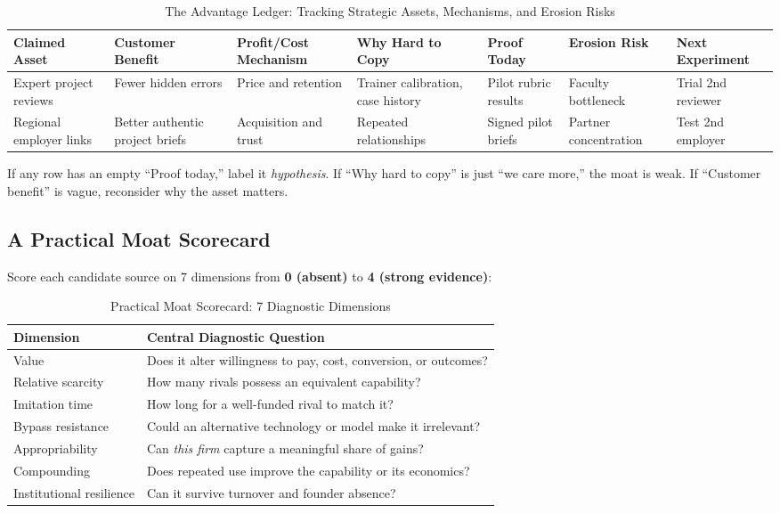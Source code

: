 \begin{table}[t]
\centering
\small
\caption{The Advantage Ledger: Tracking Strategic Assets, Mechanisms, and Erosion Risks}
\label{tab:advantage_ledger}
\begin{tabularx}{\textwidth}{p{2.2cm} p{2cm} p{2cm} p{2.6cm} p{1.8cm} p{2.4cm} X}
\toprule
\textbf{Claimed Asset} & \textbf{Customer Benefit} & \textbf{Profit/Cost Mechanism} & \textbf{Why Hard to Copy} & \textbf{Proof Today} & \textbf{Erosion Risk} & \textbf{Next Experiment} \\
\midrule
Expert project reviews & Fewer hidden errors & Price and retention & Trainer calibration, case history & Pilot rubric results & Faculty bottleneck & Trial 2nd reviewer \\
Regional employer links & Better authentic project briefs & Acquisition and trust & Repeated relationships & Signed pilot briefs & Partner concentration & Test 2nd employer \\
\bottomrule
\end{tabularx}
\end{table}

If any row has an empty ``Proof today,'' label it \textit{hypothesis}. If ``Why hard to copy'' is just ``we care more,'' the moat is weak. If ``Customer benefit'' is vague, reconsider why the asset matters.

\subsection{A Practical Moat Scorecard}
\label{sec:practical_moat_scorecard}

Score each candidate source on 7 dimensions from \textbf{0 (absent)} to \textbf{4 (strong evidence)}:

\begin{table}[h]
\centering
\small
\caption{Practical Moat Scorecard: 7 Diagnostic Dimensions}
\label{tab:moat_scorecard}
\begin{tabularx}{\columnwidth}{l X}
\toprule
\textbf{Dimension} & \textbf{Central Diagnostic Question} \\
\midrule
Value & Does it alter willingness to pay, cost, conversion, or outcomes? \\
Relative scarcity & How many rivals possess an equivalent capability? \\
Imitation time & How long for a well-funded rival to match it? \\
Bypass resistance & Could an alternative technology or model make it irrelevant? \\
Appropriability & Can \textit{this firm} capture a meaningful share of gains? \\
Compounding & Does repeated use improve the capability or its economics? \\
Institutional resilience & Can it survive turnover and founder absence? \\
\bottomrule
\end{tabularx}
\end{table}

